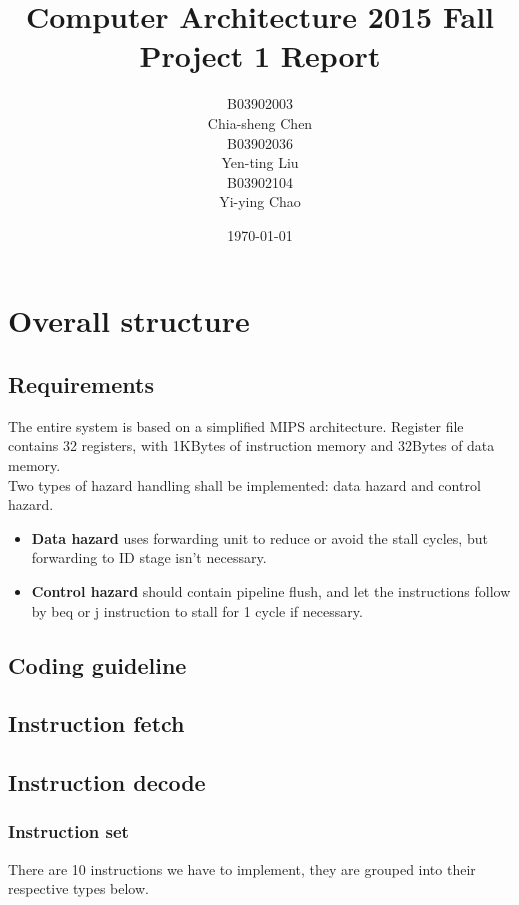 \documentclass[11pt, a4paper, twoside]{IEEEtran}
\title
{
	Computer Architecture 2015 Fall\\
	Project 1 Report
}
\author
{
	\begin{multicols}{3}
		B03902003\\Chia-sheng Chen\\
		B03902036\\Yen-ting Liu\\
		B03902104\\Yi-ying Chao
	\end{multicols}
}
\date{\today}
\begin{document}
\maketitle

\section{Overall structure}

\subsection{Requirements}
The entire system is based on a simplified MIPS architecture. Register file contains 32 registers, with 1KBytes of instruction memory and 32Bytes of data memory.\\

Two types of hazard handling shall be implemented: data hazard and control hazard.
\begin{itemize}
\item \textbf{Data hazard} uses {\sc forwarding unit} to reduce or avoid the stall cycles, but forwarding to {\sc ID} stage isn't necessary. 
\item \textbf{Control hazard} should contain pipeline flush, and let the instructions follow by beq or j instruction to stall for 1 cycle if necessary.
\end{itemize}


\subsection{Coding guideline}

\subsection{Instruction fetch}

\subsection{Instruction decode}
\subsubsection{Instruction set}
There are 10 instructions we have to implement, they are grouped into their respective types below. 
\end{document}
